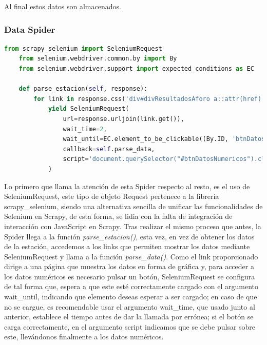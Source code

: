 Al final estos datos son almacenados.

\subsubsection{Data Spider}

\begin{lstlisting}[language=Python, caption={Función \textit{parse\_estacion()} Agua en Navarra Data Spider}]
	from scrapy_selenium import SeleniumRequest
	from selenium.webdriver.common.by import By
	from selenium.webdriver.support import expected_conditions as EC
	
	def parse_estacion(self, response):
		for link in response.css('div#divResultadosAforo a::attr(href)'):
			yield SeleniumRequest(
				url=response.urljoin(link.get()),
				wait_time=2,
				wait_until=EC.element_to_be_clickable((By.ID, 'btnDatosNumericos')),
				callback=self.parse_data,
				script='document.querySelector("#btnDatosNumericos").click()',
			)
\end{lstlisting}

Lo primero que llama la atención de esta Spider respecto al resto, es el uso de SeleniumRequest, este tipo de objeto Request pertenece a la librería scrapy\_selenium, siendo una alternativa sencilla de unificar las funcionalidades de Selenium en Scrapy, de esta forma, se lidia con la falta de integración de interacción con JavaScript en Scrapy.\newline
\newline
Tras realizar el mismo proceso que antes, la Spider llega a la función \textit{parse\_estacion()}, esta vez, en vez de obtener los datos de la estación, accedemos a los links que permiten mostrar los datos mediante SeleniumRequest y llama a la función \textit{parse\_data()}.\newline
\newline
Como el link proporcionado dirige a una página que muestra los datos en forma de gráfica y, para acceder a los datos numéricos es necesario pulsar un botón, SeleniumRequest se configura de tal forma que, espera a que este esté correctamente cargado con el argumento wait\_until, indicando que elemento deseas esperar a ser cargado; en caso de que no se cargue, es recomendable usar el argumento wait\_time, que usado junto al anterior, establece el tiempo antes de dar la llamada por errónea; si el botón se carga correctamente, en el argumento script indicamos que se debe pulsar sobre este, llevándonos finalmente a los datos numéricos.\newline
\newline

